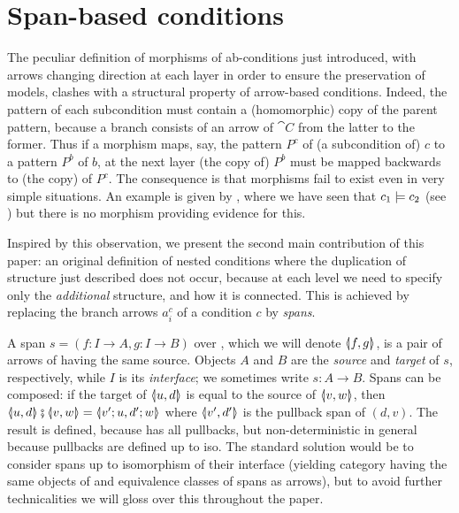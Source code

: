 \section{Span-based conditions}

The peculiar definition of morphisms of ab-conditions just introduced, with arrows changing direction at each layer in order to ensure the preservation of models, clashes with a structural property of arrow-based conditions. Indeed, the pattern of each subcondition must contain a (homomorphic) copy of the parent pattern, because a branch consists of an arrow of $\cat{C}$ from the latter to the former. Thus if a morphism maps, say, the pattern $P^c$ of (a subcondition of) $c$ to a pattern $P^b$ of $b$, at the next layer (the copy of) $P^b$ must be mapped backwards to (the copy) of $P^c$. The consequence is that morphisms fail to exist even in very simple situations. An example is given by , where we have seen that $c_1\models c_2$ (see ) but there is no morphism providing evidence for this.
  
Inspired by this observation, we present the second main contribution of this paper: an original definition of nested conditions where the duplication of structure just described does not occur, because at each level we need to specify only the \emph{additional} structure, and how it is connected. This is achieved by replacing the branch arrows $a^c_i$ of a condition $c$ by \emph{spans}.

A span $s = (f: I \to A, g:I \to B)$ over , which we will denote $\spanof f g$, is a pair of arrows of  having the same source. Objects $A$ and $B$ are the \emph{source} and \emph{target} of $s$, respectively, while $I$ is its \emph{interface}; we sometimes write $s:A\to B$. Spans can be composed: if the target of $\spanof u d$ is equal to the source of $\spanof v w$, then $\spanof u d \spcomp \spanof v w=\spanof{v';u}{d';w}$ where $\spanof {v'}{d'}$ is the pullback span of $(d,v)$. The result is defined, because  has all pullbacks, but non-deterministic in general because pullbacks are defined up to iso. The standard solution would be to consider spans up to isomorphism of their interface (yielding category {\SpanC} having the same objects of  and equivalence classes of spans as arrows), but to avoid further technicalities we will gloss over this throughout the paper.


